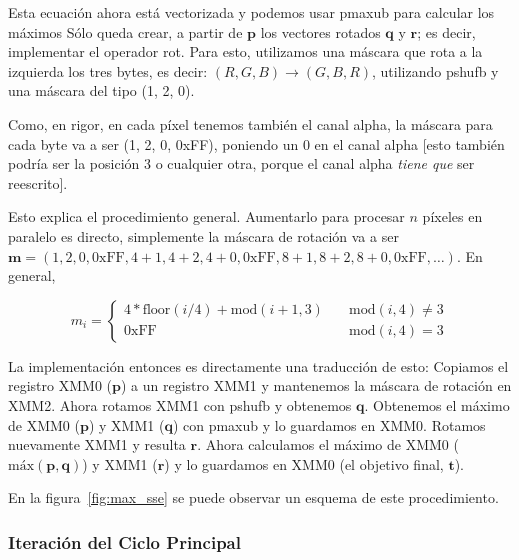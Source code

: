 Esta ecuación ahora está vectorizada y podemos usar {\ttfamily
  pmaxub} para calcular los máximos Sólo queda crear, a partir de
$\mathbf{p}$ los vectores rotados $\mathbf{q}$ y $\mathbf{r}$; es
decir, implementar el operador {\ttfamily rot}. Para esto,
utilizamos una máscara que rota a la izquierda los tres bytes, es
decir: $(R, G, B) \rightarrow (G, B, R)$, utilizando {\ttfamily
  pshufb} y una máscara del tipo (1, 2, 0).

Como, en rigor, en cada píxel tenemos también el canal alpha, la
máscara para cada byte va a ser (1, 2, 0, 0xFF), poniendo un 0 en el
canal alpha [esto también podría ser la posición 3 o cualquier otra,
porque el canal alpha \emph{tiene que} ser reescrito].


Esto explica el procedimiento general. Aumentarlo para procesar $n$
píxeles en paralelo es directo, simplemente la máscara de rotación
va a ser
$\mathbf{m} = (1, 2, 0, \text{0xFF}, 4+1, 4+2, 4+0, \text{0xFF}, 8+1, 8+2, 8+0,
\text{0xFF}, \ldots)$. En general, 

\begin{equation}
  m_i = \left\{
    \begin{array}{ll}
      4*\text{floor}(i/4) + \text{mod}(i + 1, 3) & \quad \text{mod}(i, 4) \ne 3 \\
      \text{0xFF} & \quad \text{mod}(i, 4) = 3
    \end{array}
  \right.
\end{equation}

La implementación entonces es directamente una traducción de esto:
Copiamos el registro {\ttfamily XMM0} ($\mathbf{p}$) a un registro
{\ttfamily XMM1} y mantenemos la máscara de rotación en {\ttfamily
  XMM2}. Ahora rotamos {\ttfamily XMM1} con {\ttfamily pshufb} y
obtenemos $\mathbf{q}$. Obtenemos el máximo de {\ttfamily XMM0}
($\mathbf{p}$) y {\ttfamily XMM1} ($\mathbf{q}$) con {\ttfamily
  pmaxub} y lo guardamos en {\ttfamily XMM0}. Rotamos nuevamente
{\ttfamily XMM1} y resulta $\mathbf{r}$. Ahora calculamos el máximo
de {\ttfamily XMM0} ($\text{máx}(\mathbf{p}, \mathbf{q})$) y
{\ttfamily XMM1} ($\mathbf{r}$) y lo guardamos en {\ttfamily XMM0}
(el objetivo final, $\mathbf{t}$).

En la figura~\ref{fig:max_sse} se puede observar un esquema de este
procedimiento.



\subsubsection{Iteración del Ciclo Principal}

